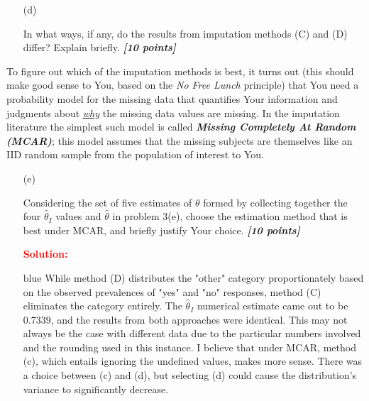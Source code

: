 \documentclass[12pt]{article}
\newcommand{\bi}[1]{\b{\i{#1}}}
\renewcommand{\b}[1]{\textbf{#1}}
\renewcommand{\i}[1]{\textit{#1}}
\renewcommand{\u}[1]{\underline{#1}}
\begin{document}
\begin{itemize}
\begin{itemize}
\vspace*{1.0in}

\item[(d)]

In what ways, if any, do the results from imputation methods (C) and (D) differ? Explain briefly. \bi{[10 points]}

\vspace*{1.0in}

\end{itemize}

To figure out which of the imputation methods is best, it turns out (this should make good sense to You, based on the \textit{No Free Lunch} principle) that You need a probability model for the missing data that quantifies Your information and judgments about \i{\u{why}} the missing data values are missing. In the imputation literature the simplest such model is called \textbf{\textit{Missing Completely At Random (MCAR)}}; this model assumes that the missing subjects are themselves like an IID random sample from the population of interest to You.

\begin{itemize}

\item[(e)]

Considering the set of five estimates of $\theta$ formed by collecting together the four 
$\hat{ \theta }_I$ values and $\hat{ \theta }$ in problem 3(e), choose the estimation method that is best under MCAR, and briefly justify Your choice. \bi{[10 points]}

\textbf{\textcolor{red}{Solution:}}
\begin{Solution4}{blue}
While method (D) distributes the "other" category proportionately based on the observed prevalences of "yes" and "no" responses, method (C) eliminates the category entirely. The $\hat{ \theta }_I$ numerical estimate came out to be 0.7339, and the results from both approaches were identical. This may not always be the case with different data due to the particular numbers involved and the rounding used in this instance. I believe that under MCAR, method (c), which entails ignoring the undefined values, makes more sense. There was a choice between (c) and (d), but selecting (d) could cause the distribution's variance to significantly decrease.

\end{Solution4}

\vspace*{1.0in}


\end{itemize}
\end{itemize}
\end{document}
